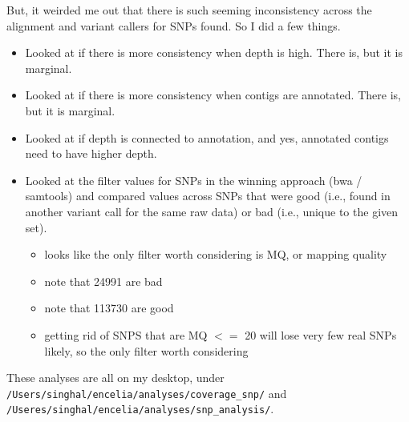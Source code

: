 \documentclass[idxtotoc,hyperref,openany,oneside]{labbook} %
\begin{document}
But, it weirded me out that there is such seeming inconsistency across the alignment and variant callers for SNPs found. So I did a few things.
\begin{itemize}
\item Looked at if there is more consistency when depth is high. There is, but it is marginal.
\item Looked at if there is more consistency when contigs are annotated. There is, but it is marginal.
\item Looked at if depth is connected to annotation, and yes, annotated contigs need to have higher depth.
\item Looked at the filter values for SNPs in the winning approach (bwa / samtools) and compared values across SNPs that were good (i.e., found in another variant call for the same raw data) or bad (i.e., unique to the given set).
\begin{itemize}
\item looks like the only filter worth considering is MQ, or mapping quality
\item note that 24991 are bad
\item note that 113730 are good
\item getting rid of SNPS that are MQ $<=$ 20 will lose very few real SNPs likely, so the only filter worth considering
\end{itemize}
\end{itemize}
These analyses are all on my desktop, under \verb+/Users/singhal/encelia/analyses/coverage_snp/+ and \verb+/Useres/singhal/encelia/analyses/snp_analysis/+.
\end{document}
